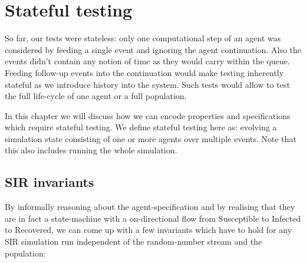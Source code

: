 \chapter{Stateful testing}
So far, our tests were stateless: only one computational step of an agent was considered by feeding a single event and ignoring the agent continuation. Also the events didn't contain any notion of time as they would carry within the queue. Feeding follow-up events into the continuation would make testing inherently stateful as we introduce history into the system. Such tests would allow to test the full life-cycle of one  agent or a full population.

In this chapter we will discuss how we can encode properties and specifications which require stateful testing. We define stateful testing here as: evolving a simulation state consisting of one or more agents over multiple events. Note that this also includes running the whole simulation.

\section{SIR invariants}
By informally reasoning about the agent-specification and by realising that they are in fact a state-machine with a on-directional flow from Susceptible to Infected to Recovered, we can come up with a few invariants which have to hold for any SIR simulation run independent of the random-number stream and the population:

